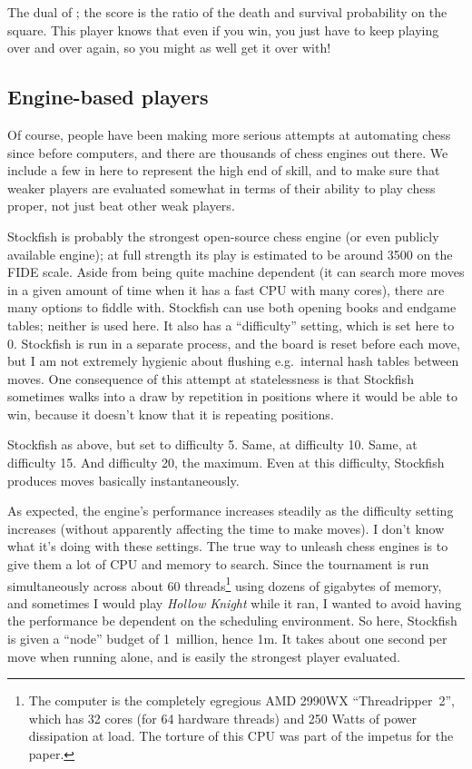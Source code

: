 \documentclass[10pt,preprint,twocolumn]{acmart}
\begin{document}
 The dual of ; the score is
the ratio of the death and survival probability on the square. This
player knows that even if you win, you just have to keep playing over
and over again, so you might as well get it over with!

\subsection{Engine-based players}

Of course, people have been making more serious attempts at automating
chess since before computers, and there are thousands of chess engines
out there. We include a few in here to represent the high end of
skill, and to make sure that weaker players are evaluated somewhat in
terms of their ability to play chess proper, not just beat other weak
players.

 Stockfish is probably the strongest
open-source chess engine (or even publicly available engine); at full
strength its play is estimated to be around 3500 on the FIDE scale.
Aside from being quite machine dependent (it can search more moves in
a given amount of time when it has a fast CPU with many cores), there
are many options to fiddle with. Stockfish can use both opening books
and endgame tables; neither is used here. It also has a ``difficulty''
setting, which is set here to 0. Stockfish is run in a separate
process, and the board is reset before each move, but I am not
extremely hygienic about flushing e.g.~internal hash tables between
moves. One consequence of this attempt at statelessness is that
Stockfish sometimes walks into a draw by repetition in positions
where it would be able to win, because it doesn't know that it is
repeating positions.

 Stockfish as above, but set to difficulty
5.
 Same, at difficulty 10.
 Same, at difficulty 15.
 And difficulty 20, the maximum. Even
at this difficulty, Stockfish produces moves basically instantaneously.

 As expected, the engine's performance
increases steadily as the difficulty setting increases (without
apparently affecting the time to make moves). I don't know what it's
doing with these settings. The true way to unleash chess engines is to
give them a lot of CPU and memory to search. Since the tournament is
run simultaneously across about 60 threads\footnote{ The computer is
  the completely egregious AMD 2990WX ``Threadripper~2'', which has 32
  cores (for 64 hardware threads) and 250 Watts of power dissipation
  at load. The torture of this CPU was part of the impetus for the
  paper.} using dozens of gigabytes of memory, and sometimes I would
play {\it Hollow Knight} while it ran, I wanted to avoid having the
performance be dependent on the scheduling environment. So here,
Stockfish is given a ``node'' budget of 1~million, hence {\sf 1m}. It
takes about one second per move when running alone, and is easily the
strongest player evaluated.
\end{document}
